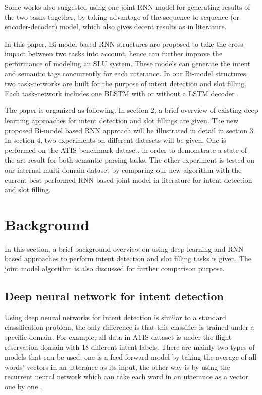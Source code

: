 \documentclass[11pt,a4paper]{article}
\begin{document}
Some works also suggested using one joint RNN model for generating results of the two tasks together, by taking advantage of the sequence to sequence\cite{sutskever2014sequence} (or encoder-decoder) model, which also gives decent results as in literature\cite{liu2016attention}.

In this paper, Bi-model based RNN structures are proposed to take the cross-impact between two tasks into account, hence can further improve the performance of modeling an SLU system. These models can generate the intent and semantic tags concurrently for each utterance. In our Bi-model structures, two task-networks are built for the purpose of intent detection and slot filling. Each task-network includes one BLSTM with or without a LSTM decoder \cite{hochreiter1997long,graves2005framewise}.

The paper is organized as following: In section 2, a brief overview of existing deep learning approaches for intent detection and slot fillings are given. The new proposed Bi-model based RNN approach will be illustrated in detail in section 3. In section 4, two experiments on different datasets will be given. One is performed on the ATIS benchmark dataset, in order to demonstrate a state-of-the-art result for both semantic parsing tasks. The other experiment is tested on our internal multi-domain dataset by comparing our new algorithm with the current best performed RNN based joint model in literature for intent detection and slot filling.
\section{Background}
In this section, a brief background overview on using deep learning and RNN based approaches to perform intent detection and slot filling tasks is given. The joint model algorithm is also discussed for further comparison purpose.
\subsection{Deep neural network for intent detection}
Using deep neural networks for intent detection is similar to a standard classification problem, the only difference is that this classifier is trained under a specific domain. For example, all data in ATIS dataset is under the flight reservation domain with 18 different intent labels. There are mainly two types of models that can be used: one is a feed-forward model by taking the average of all words' vectors in an utterance as its input, the other way is by using the recurrent neural network which can take each word in an utterance as a vector one by one \cite{xu2014contextual}. 
\end{document}
